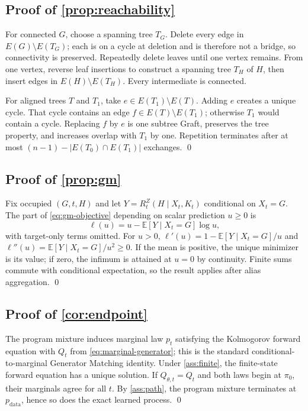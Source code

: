 \documentclass{article}
\newcommand{\pdata}{p_{\mathrm{data}}}
\newcommand{\pzero}{\pi_0}
\newcommand{\E}{\mathbb{E}}
\theoremstyle{definition}
\theoremstyle{remark}
\begin{document}
\subsection{Proof of \cref{prop:reachability}}

For connected $G$, choose a spanning tree $T_G$. Delete every edge in $E(G)\setminus E(T_G)$; each is on a cycle at deletion and is therefore not a bridge, so connectivity is preserved. Repeatedly delete leaves until one vertex remains. From one vertex, reverse leaf insertions to construct a spanning tree $T_H$ of $H$, then insert edges in $E(H)\setminus E(T_H)$. Every intermediate is connected.

For aligned trees $T$ and $T_1$, take $e\in E(T_1)\setminus E(T)$. Adding $e$ creates a unique cycle. That cycle contains an edge $f\in E(T)\setminus E(T_1)$; otherwise $T_1$ would contain a cycle. Replacing $f$ by $e$ is one subtree Graft, preserves the tree property, and increases overlap with $T_1$ by one. Repetition terminates after at most $(n-1)-|E(T_0)\cap E(T_1)|$ exchanges. \qed

\subsection{Proof of \cref{prop:gm}}

Fix occupied $(G,t,H)$ and let $Y=R_t^Z(H\mid X_t,K_t)$ conditional on $X_t=G$. The part of \eqref{eq:gm-objective} depending on scalar prediction $u\ge0$ is
\begin{equation}
\ell(u)=u-\E[Y\mid X_t=G]\log u,
\end{equation}
with target-only terms omitted. For $u>0$, $\ell'(u)=1-\E[Y\mid X_t=G]/u$ and $\ell''(u)=\E[Y\mid X_t=G]/u^2\ge0$. If the mean is positive, the unique minimizer is its value; if zero, the infimum is attained at $u=0$ by continuity. Finite sums commute with conditional expectation, so the result applies after alias aggregation. \qed

\subsection{Proof of \cref{cor:endpoint}}

The program mixture induces marginal law $p_t$ satisfying the Kolmogorov forward equation with $Q_t$ from \eqref{eq:marginal-generator}; this is the standard conditional-to-marginal Generator Matching identity. Under \cref{ass:finite}, the finite-state forward equation has a unique solution. If $Q_{\theta,t}=Q_t$ and both laws begin at $\pzero$, their marginals agree for all $t$. By \cref{ass:path}, the program mixture terminates at $\pdata$, hence so does the exact learned process. \qed
\end{document}

